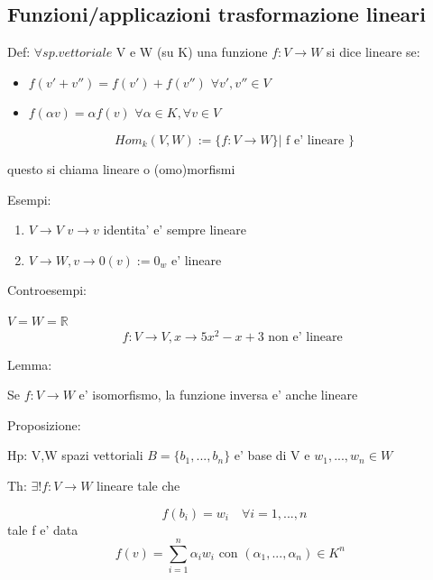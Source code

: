 \documentclass{article}
\begin{document}
\subsection{Funzioni/applicazioni trasformazione lineari}
\begin{flushleft}
	Def: $\forall sp.vettoriale$ V e W (su K) una funzione $f: V \to W$ si dice lineare se:
\end{flushleft}
\begin{itemize}
	\item $f(v'+v'')=f(v')+f(v'')$ $\forall v',v'' \in V$
	\item $f(\alpha v)=\alpha f(v)$ $\forall \alpha \in K, \forall v \in V$
\end{itemize}
\begin{equation*}
	Hom_k(V,W):=\{ f:V \to W \} | \text{ f e' lineare } \}
\end{equation*}
\begin{flushleft}
	questo si chiama lineare o (omo)morfismi
\end{flushleft}
Esempi:
\begin{flushleft}
	\begin{enumerate}
		\item $V \to V$ $v \to v$ identita' e' sempre lineare
		\item $V \to W, v\to 0(v):= 0_w$ e' lineare
	\end{enumerate}
\end{flushleft}
Controesempi:
\begin{flushleft}
	\item $V=W=\mathbb{R}$
	\begin{equation*}
		f:V \to V, x\to 5x^2-x+3 \text{ non e' lineare }
	\end{equation*}
\end{flushleft}
Lemma:
\begin{flushleft}
	Se $f: V \to W$ e' isomorfismo, la funzione inversa e' anche lineare
\end{flushleft}
Proposizione:
\begin{flushleft}
	Hp: V,W spazi vettoriali $B = \{b_1,...,b_n \}$ e' base di V e $w_1,...,w_n \in W$
\end{flushleft}
\begin{flushleft}
	Th: $\exists ! f: V \to W$ lineare tale che
\end{flushleft}
\begin{equation*}
	f(b_i)=w_i \quad \forall i=1,...,n
\end{equation*}
tale f e' data
\begin{equation*}
	f(v)= \sum^n_{i=1} \alpha_i w_i \text{ con $(\alpha_1,...,\alpha_n) \in K^n$ }
\end{equation*}
\end{document}
